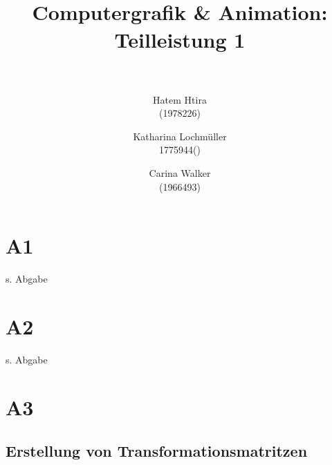 



\title{	
	\normalfont \normalsize 
	\horrule{0.5pt} \\[0.4cm]
	\huge Computergrafik \& Animation: Teilleistung 1 \\
	\horrule{0.5pt} \\[0.5cm]
}

\author{
	Hatem Htira	\\ \small (1978226)
	\and
	Katharina Lochmüller\\ \small 1775944()
	\and
	Carina Walker\\ \small (1966493)
}


\maketitle

\section{A1}
s. Abgabe

\section{A2}
s. Abgabe

\section{A3}
\subsection{Erstellung von Transformationsmatritzen}
